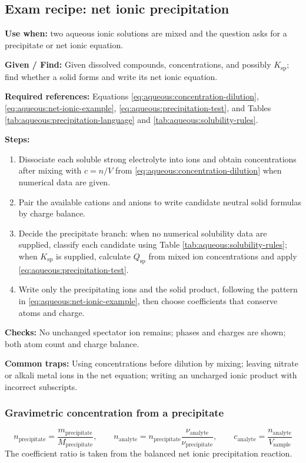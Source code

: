 \subsection{Exam recipe: net ionic precipitation}
\textbf{Use when:} two aqueous ionic solutions are mixed and the question asks for a precipitate or net ionic equation.

\textbf{Given / Find:} Given dissolved compounds, concentrations, and possibly \(K_{\mathrm{sp}}\); find whether a solid forms and write its net ionic equation.

\textbf{Required references:} Equations \eqref{eq:aqueous:concentration-dilution}, \eqref{eq:aqueous:net-ionic-example}, \eqref{eq:aqueous:precipitation-test}, and Tables \ref{tab:aqueous:precipitation-language} and \ref{tab:aqueous:solubility-rules}.

\textbf{Steps:}
\begin{enumerate}
    \item Dissociate each soluble strong electrolyte into ions and obtain concentrations after mixing with \(c=n/V\) from \eqref{eq:aqueous:concentration-dilution} when numerical data are given.
    \item Pair the available cations and anions to write candidate neutral solid formulas by charge balance.
    \item Decide the precipitate branch: when no numerical solubility data are supplied, classify each candidate using Table \ref{tab:aqueous:solubility-rules}; when \(K_{\mathrm{sp}}\) is supplied, calculate \(Q_{\mathrm{sp}}\) from mixed ion concentrations and apply \eqref{eq:aqueous:precipitation-test}.
    \item Write only the precipitating ions and the solid product, following the pattern in \eqref{eq:aqueous:net-ionic-example}, then choose coefficients that conserve atoms and charge.
\end{enumerate}

\textbf{Checks:} No unchanged spectator ion remains; phases and charges are shown; both atom count and charge balance.

\textbf{Common traps:} Using concentrations before dilution by mixing; leaving nitrate or alkali metal ions in the net equation; writing an uncharged ionic product with incorrect subscripts.

\subsubsection{Gravimetric concentration from a precipitate}
\begin{equation}\label{eq:aqueous:gravimetric-precipitation}
n_{\mathrm{precipitate}}=\frac{m_{\mathrm{precipitate}}}{M_{\mathrm{precipitate}}},
\qquad
n_{\mathrm{analyte}}=n_{\mathrm{precipitate}}
\frac{\nu_{\mathrm{analyte}}}{\nu_{\mathrm{precipitate}}},
\qquad
c_{\mathrm{analyte}}=\frac{n_{\mathrm{analyte}}}{V_{\mathrm{sample}}}
\end{equation}
The coefficient ratio is taken from the balanced net ionic precipitation reaction.

